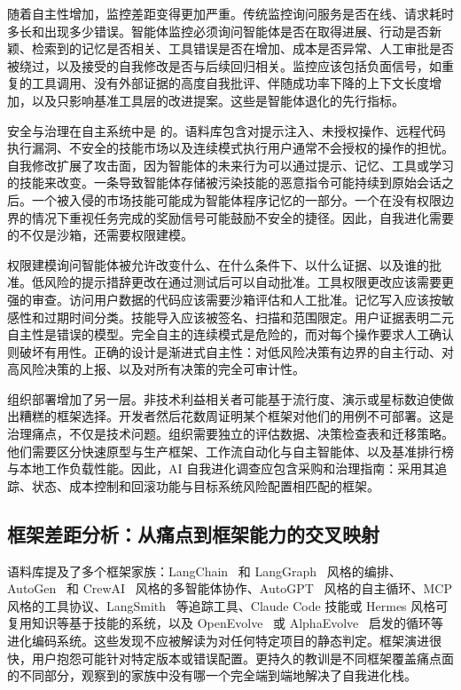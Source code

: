 随着自主性增加，监控差距变得更加严重。传统监控询问服务是否在线、请求耗时多长和出现多少错误。智能体监控必须询问智能体是否在取得进展、行动是否新颖、检索到的记忆是否相关、工具错误是否在增加、成本是否异常、人工审批是否被绕过，以及接受的自我修改是否与后续回归相关。监控应该包括负面信号，如重复的工具调用、没有外部证据的高度自我批评、伴随成功率下降的上下文长度增加，以及只影响基准工具层的改进提案。这些是智能体退化的先行指标。

安全与治理在自主系统中是 \sevcritical{} 的。语料库包含对提示注入、未授权操作、远程代码执行漏洞、不安全的技能市场以及连续模式执行用户通常不会授权的操作的担忧。自我修改扩展了攻击面，因为智能体的未来行为可以通过提示、记忆、工具或学习的技能来改变。一条导致智能体存储被污染技能的恶意指令可能持续到原始会话之后。一个被入侵的市场技能可能成为智能体程序记忆的一部分。一个在没有权限边界的情况下重视任务完成的奖励信号可能鼓励不安全的捷径。因此，自我进化需要的不仅是沙箱，还需要权限建模。

权限建模询问智能体被允许改变什么、在什么条件下、以什么证据、以及谁的批准。低风险的提示措辞更改在通过测试后可以自动批准。工具权限更改应该需要更强的审查。访问用户数据的代码应该需要沙箱评估和人工批准。记忆写入应该按敏感性和过期时间分类。技能导入应该被签名、扫描和范围限定。用户证据表明二元自主性是错误的模型。完全自主的连续模式是危险的，而对每个操作要求人工确认则破坏有用性。正确的设计是渐进式自主性：对低风险决策有边界的自主行动、对高风险决策的上报、以及对所有决策的完全可审计性。

组织部署增加了另一层。非技术利益相关者可能基于流行度、演示或星标数迫使做出糟糕的框架选择。开发者然后花数周证明某个框架对他们的用例不可部署。这是治理痛点，不仅是技术问题。组织需要独立的评估数据、决策检查表和迁移策略。他们需要区分快速原型与生产框架、工作流自动化与自主智能体、以及基准排行榜与本地工作负载性能。因此，AI 自我进化调查应包含采购和治理指南：采用其追踪、状态、成本控制和回滚功能与目标系统风险配置相匹配的框架。

\subsection{框架差距分析：从痛点到框架能力的交叉映射}
\label{subsec:framework-crosswalk}

语料库提及了多个框架家族：LangChain~\cite{chase2023langchain} 和 LangGraph~\cite{langgraph2024} 风格的编排、AutoGen~\cite{autogen2023} 和 CrewAI~\cite{crewai2024} 风格的多智能体协作、AutoGPT~\cite{autogpt2023} 风格的自主循环、MCP 风格的工具协议、LangSmith~\cite{langgraph2024} 等追踪工具、Claude Code 技能或 Hermes 风格可复用知识等基于技能的系统，以及 OpenEvolve~\cite{openevolve2024} 或 AlphaEvolve~\cite{alphaevolve2025} 启发的循环等进化编码系统。这些发现不应被解读为对任何特定项目的静态判定。框架演进很快，用户抱怨可能针对特定版本或错误配置。更持久的教训是不同框架覆盖痛点面的不同部分，观察到的家族中没有哪一个完全端到端地解决了自我进化栈。

